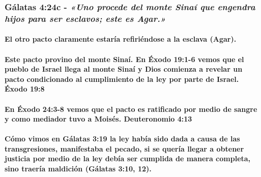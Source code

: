 \documentclass[11a pt,twoside]{article}
\newcommand{\scripture}[1]{%
  {\fontsize{12pt}{16pt}\selectfont\ScriptureFont\itshape #1}%
}
\let\oldsubsubsection\subsubsection
\renewcommand{\subsubsection}{\needspace{4\baselineskip}\oldsubsubsection}
\let\oldparagraph\paragraph
\renewcommand{\paragraph}{\needspace{3\baselineskip}\oldparagraph}
\begin{document}
\subsubsection{\texorpdfstring{Gálatas 4:24c -
\scripture{«Uno procede del monte Sinaí que engendra hijos para ser esclavos; este es Agar.»}}{Gálatas 4:24c - }}\label{guxe1latas-424c---uno-procede-del-monte-sinauxed-que-engendra-hijos-para-ser-esclavos-este-es-agar.}

\paragraph{El otro pacto claramente estaría refiriéndose a la esclava
(Agar).}\label{el-otro-pacto-claramente-estaruxeda-refiriuxe9ndose-a-la-esclava-agar.}

\paragraph{Este pacto provino del monte Sinaí. En Éxodo 19:1-6 vemos que
el pueblo de Israel llega al monte Sinaí y Dios comienza a revelar un
pacto condicionado al cumplimiento de la ley por parte de Israel. Éxodo
19:8}\label{este-pacto-provino-del-monte-sinauxed.-en-uxe9xodo-191-6-vemos-que-el-pueblo-de-israel-llega-al-monte-sinauxed-y-dios-comienza-a-revelar-un-pacto-condicionado-al-cumplimiento-de-la-ley-por-parte-de-israel.-uxe9xodo-198}

\paragraph{En Éxodo 24:3-8 vemos que el pacto es ratificado por medio de
sangre y como mediador tuvo a Moisés. Deuteronomio
4:13}\label{en-uxe9xodo-243-8-vemos-que-el-pacto-es-ratificado-por-medio-de-sangre-y-como-mediador-tuvo-a-moisuxe9s.-deuteronomio-413}

\paragraph{Cómo vimos en Gálatas 3:19 la ley había sido dada a causa de
las transgresiones, manifestaba el pecado, si se quería llegar a obtener
justicia por medio de la ley debía ser cumplida de manera completa, sino
traería maldición (Gálatas 3:10,
12).}\label{cuxf3mo-vimos-en-guxe1latas-319-la-ley-habuxeda-sido-dada-a-causa-de-las-transgresiones-manifestaba-el-pecado-si-se-queruxeda-llegar-a-obtener-justicia-por-medio-de-la-ley-debuxeda-ser-cumplida-de-manera-completa-sino-traeruxeda-maldiciuxf3n-guxe1latas-310-12.}
\end{document}

